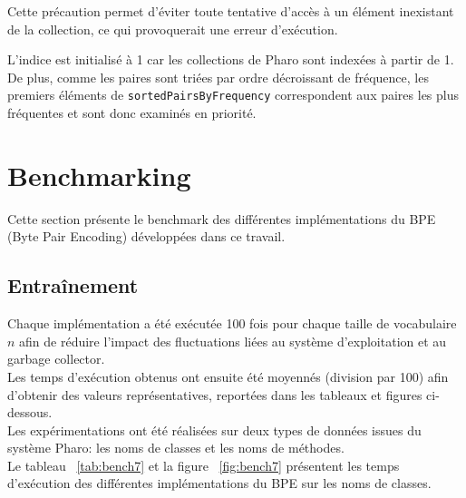 \documentclass[12pt,a4paper]{report}
\begin{document}
	Cette précaution permet d'éviter toute tentative d'accès à un élément inexistant de la collection, ce qui provoquerait une erreur d'exécution.
	
	L'indice est initialisé à 1 car les collections de Pharo sont indexées à partir de 1. De plus, comme les paires sont triées par ordre décroissant de fréquence, les premiers éléments de \texttt{sortedPairsByFrequency} correspondent aux paires les plus fréquentes et sont donc examinés en priorité.

	\section{Benchmarking}
	
	Cette section présente le benchmark des différentes implémentations du BPE (Byte Pair Encoding) développées dans ce travail.
	
	\subsection{Entraînement}

	Chaque implémentation a été exécutée 100 fois pour chaque taille de vocabulaire $n$ afin de réduire l’impact des fluctuations liées au système d’exploitation et au garbage collector.\\
	Les temps d’exécution obtenus ont ensuite été moyennés (division par 100) afin d’obtenir des valeurs représentatives, reportées dans les tableaux et figures ci-dessous.\\
	Les expérimentations ont été réalisées sur deux types de données issues du système Pharo: les noms de classes et les noms de méthodes.\\
	
	Le tableau ~\ref{tab:bench7} et la figure ~\ref{fig:bench7} présentent les temps d’exécution des différentes implémentations du BPE sur les noms de classes.
	
\end{document}
